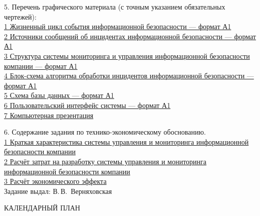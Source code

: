 {  \clearpage
  \thispagestyle{empty}

  5. Перечень графического материала (с точным указанием обязательных чертежей):
  \lineunderscore\\
  \uline{\hspace*{2ex}1 Жизненный цикл события информационной безопасности --- формат А1}\lineunderscore\\
  \uline{\hspace*{2ex}2 Источники сообщений об инцидентах информационной безопасности --- формат А1}\lineunderscore\\
  \uline{\hspace*{2ex}3 Структура системы мониторинга и управления информационной безопасности компании --- формат А1}\lineunderscore\\
  \uline{\hspace*{2ex}4 Блок-схема алгоритма обработки инцидентов информационной безопасности  --- формат А1}\lineunderscore\\
  \uline{\hspace*{2ex}5 Схема базы данных --- формат А1}\lineunderscore\\
  \uline{\hspace*{2ex}6 Пользовательский интерфейс системы --- формат А1}\lineunderscore\\
  \uline{\hspace*{2ex}7 Компьютерная презентация}\lineunderscore

  \vspace{1em}

  6. Содержание задания по технико-экономическому обоснованию.\\
    \uline{\hspace*{2ex}1 Краткая характеристика системы управления и мониторинга информационной безопасности компании}\lineunderscore\\
    \uline{\hspace*{2ex}2 Расчёт затрат на разработку системы управления и мониторинга информационной безопасности компании}\lineunderscore\\
    \uline{\hspace*{2ex}3 Расчёт экономического эффекта}\lineunderscore\\

  Задание выдал: \hfill{} \uline{\hspace*{6em}}  В.\,В.~Верняховская 

  \vspace{1em}


  \begin{center}
    КАЛЕНДАРНЫЙ ПЛАН
  \end{center}

}
